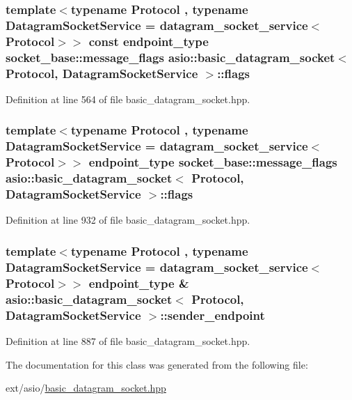 \subsubsection[{flags}]{\setlength{\rightskip}{0pt plus 5cm}template$<$typename Protocol , typename Datagram\+Socket\+Service  = datagram\+\_\+socket\+\_\+service$<$\+Protocol$>$$>$ const {\bf endpoint\+\_\+type} {\bf socket\+\_\+base\+::message\+\_\+flags} {\bf asio\+::basic\+\_\+datagram\+\_\+socket}$<$ Protocol, Datagram\+Socket\+Service $>$\+::flags}\label{classasio_1_1basic__datagram__socket_a21209afeb1d5c1e0c76f3165dcfba9de}


Definition at line 564 of file basic\+\_\+datagram\+\_\+socket.\+hpp.

\hypertarget{classasio_1_1basic__datagram__socket_ad7950a8735d696a465df0eb6f4cefcae}{}
\subsubsection[{flags}]{\setlength{\rightskip}{0pt plus 5cm}template$<$typename Protocol , typename Datagram\+Socket\+Service  = datagram\+\_\+socket\+\_\+service$<$\+Protocol$>$$>$ {\bf endpoint\+\_\+type} {\bf socket\+\_\+base\+::message\+\_\+flags} {\bf asio\+::basic\+\_\+datagram\+\_\+socket}$<$ Protocol, Datagram\+Socket\+Service $>$\+::flags}\label{classasio_1_1basic__datagram__socket_ad7950a8735d696a465df0eb6f4cefcae}


Definition at line 932 of file basic\+\_\+datagram\+\_\+socket.\+hpp.

\hypertarget{classasio_1_1basic__datagram__socket_aab9cb430375ca536da3d5a145e6b780e}{}
\subsubsection[{sender\+\_\+endpoint}]{\setlength{\rightskip}{0pt plus 5cm}template$<$typename Protocol , typename Datagram\+Socket\+Service  = datagram\+\_\+socket\+\_\+service$<$\+Protocol$>$$>$ {\bf endpoint\+\_\+type} \& {\bf asio\+::basic\+\_\+datagram\+\_\+socket}$<$ Protocol, Datagram\+Socket\+Service $>$\+::sender\+\_\+endpoint}\label{classasio_1_1basic__datagram__socket_aab9cb430375ca536da3d5a145e6b780e}


Definition at line 887 of file basic\+\_\+datagram\+\_\+socket.\+hpp.



The documentation for this class was generated from the following file\+:\begin{DoxyCompactItemize}
\item 
ext/asio/\hyperlink{basic__datagram__socket_8hpp}{basic\+\_\+datagram\+\_\+socket.\+hpp}\end{DoxyCompactItemize}
